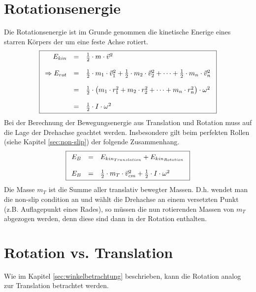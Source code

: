 \section{Rotationsenergie}
Die Rotationsenergie ist im Grunde genommen die kinetische Enerige
eines starren Körpers der um eine feste Achse rotiert.
\[ \boxed{\begin{array}{r c l}
	E_{kin} 
		&=& \frac{1}{2} \cdot m \cdot \vec{v}^2 \\
	& & \\
	\Rightarrow E_{rot} 
		&=& \frac{1}{2} \cdot m_1 \cdot \vec{v}_1^2
			+ \frac{1}{2} \cdot m_2 \cdot \vec{v}_2^2
			+ \dots 
			+ \frac{1}{2} \cdot m_n \cdot \vec{v}_n^2 \\
	& & \\
		&=& \frac{1}{2} \cdot \left(m_1 \cdot r_1^2
			+ m_2 \cdot r_2^2 
			+ \dots
			+ m_n \cdot r_n^2\right) \cdot \omega^2 \\
	& &\\
		&=& \frac{1}{2} \cdot I \cdot \omega^2 
\end{array} } \]
Bei der Berechnung der Bewegungsenergie aus Translation und 
Rotation muss auf die Lage der Drehachse geachtet werden. Insbesondere 
gilt beim perfekten Rollen (siehe Kapitel \ref{sec:non-slip}) der 
folgende Zusammenhang.
\[ \boxed{\begin{array}{r c l}
	E_B 
		&=& E_{kin_{Translation}} + E_{kin_{Rotation}} \\
	& \\
	E_B 
		&=& \frac{1}{2} \cdot m_T \cdot {\vec{v}_{cm}}^2 
			+ \frac{1}{2} \cdot I \cdot \omega^2 
\end{array}}\]
Die Masse $m_T$ ist die Summe aller translativ bewegter Massen. D.h. 
wendet man die non-slip condition an und wählt die Drehachse an einem 
versetzten Punkt (z.B. Auflagepunkt eines Rades), so müssen die nun
rotierenden Massen von $m_T$ abgezogen werden, denn diese sind dann in
der Rotation enthalten.
\newpage
\section{Rotation vs. Translation}
Wie im Kapitel \ref{sec:winkelbetrachtung} beschrieben, kann die 
Rotation analog zur Translation betrachtet werden.

